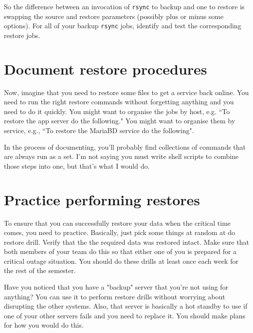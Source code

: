 \documentclass{article}   	%
\begin{document}
So the difference between an invocation of \texttt{rsync} to backup and one to restore is swapping the source and restore parameters (possibly plus or minus some options). For all of your backup \texttt{rsync} jobs, identify and test the corresponding restore jobs.

\section{Document restore procedures}
Now, imagine that you need to restore some files to get a service back online. You need to run the right restore commands without forgetting anything and you need to do it quickly. You might want to organise the jobs by host, e.g. ``To restore the app server do the following." You might want to organise them by service, e.g., ``To restore the MariaBD service do the following".  

In the process of documenting, you'll probably find collections of commands that are always run as a set. I'm not saying you must write shell scripts to combine those steps into one, but that's what I would do.

\section{Practice performing restores}
To ensure that you can successfully restore your data when the critical time comes, you need to practice. Basically, just pick some things at random at do restore drill. Verify that the the required data was restored intact. Make sure that both members of your team do this so that either one of you is prepared for a critical outage situation. You should do these drills at least once each week for the rest of the semester.

Have you noticed that you have a "backup" server that you're not using for anything? You can use it to perform restore drills without worrying about disrupting the other systems. Also, that server is basically a hot standby to use if one of your other servers fails and you need to replace it. You should make plans for how you would do this.

  
\end{document}
